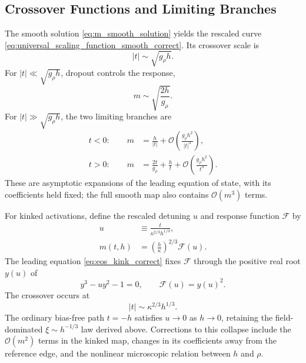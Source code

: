 \subsection{Crossover Functions and Limiting Branches}
\label{app:crossover_details}

The smooth solution \eqref{eq:m_smooth_solution} yields the rescaled curve \eqref{eq:universal_scaling_function_smooth_correct}. Its crossover scale is
\begin{equation}
|t|\sim\sqrt{g_\rho h}.
\label{eq:crossover_scale_smooth}
\end{equation}
For $|t|\ll\sqrt{g_\rho h}$, dropout controls the response,
\begin{equation}
m\sim\sqrt{\frac{2h}{g_\rho}}.
\label{eq:field_dominated_smooth}
\end{equation}
For $|t|\gg\sqrt{g_\rho h}$, the two limiting branches are
\begin{align}
t<0:\qquad m&=\frac{h}{|t|}+\mathcal O\!\left(\frac{g_\rho h^2}{|t|^3}\right),\\
t>0:\qquad m&=\frac{2t}{g_\rho}+\frac{h}{t}+\mathcal O\!\left(\frac{g_\rho h^2}{t^3}\right).
\end{align}
These are asymptotic expansions of the leading equation of state, with its coefficients held fixed; the full smooth map also contains $\mathcal O(m^3)$ terms.

For kinked activations, define the rescaled detuning $u$ and response function $\mathcal F$ by
\begin{align}
u&\equiv\frac{t}{\kappa^{2/3}h^{1/3}},
\label{eq:def_u}\\
m(t,h)&=\left(\frac{h}{\kappa}\right)^{2/3}\mathcal F(u).
\label{eq:m_kink_scaling_form}
\end{align}
The leading equation \eqref{eq:eos_kink_correct} fixes $\mathcal F$ through the positive real root $y(u)$ of
\begin{equation}
y^3-uy^2-1=0,\qquad \mathcal F(u)=y(u)^2.
\label{eq:cubic_y_correct}
\end{equation}
The crossover occurs at
\begin{equation}
|t|\sim\kappa^{2/3}h^{1/3}.
\label{eq:crossover_scale_kink}
\end{equation}
The ordinary bias-free \relu{} path $t=-h$ satisfies $u\to0$ as $h\to0$, retaining the field-dominated $\xi\sim h^{-1/3}$ law derived above. Corrections to this collapse include the $\mathcal O(m^2)$ terms in the kinked map, changes in its coefficients away from the reference edge, and the nonlinear microscopic relation between $h$ and $\rho$.
